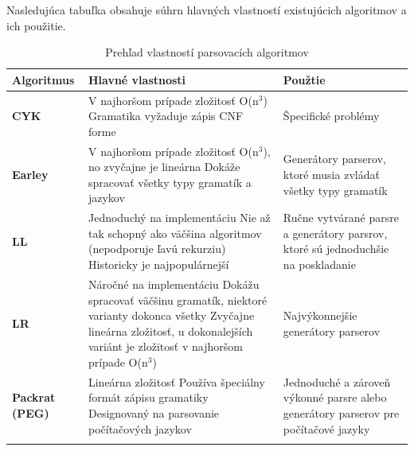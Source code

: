 Nasledujúca tabuľka obsahuje súhrn hlavných vlastností existujúcich algoritmov a ich použitie\cite{tomassetti:parsing}.

\begin{longtable}{|p{2.5cm}|p{6cm}|p{5.5cm}|}
\hline
\textbf{Algoritmus}    & \textbf{Hlavné vlastnosti}    						& \textbf{Použtie} \\ \hline
\textbf{CYK} \cite{CYK} & V najhoršom prípade zložitosť O(n$^3$)\newline 
						Gramatika vyžaduje zápis CNF forme					& Špecifické problémy \\ \hline
                        
\textbf{Earley}
\cite{earley}		  & V najhoršom prípade zložitosť O(n$^3$), 
						no zvyčajne je lineárna\newline 
                        Dokáže spracovať všetky typy gramatík a jazykov		& Generátory parserov, ktoré musia 
                                                                              zvládať všetky typy gramatík  \\ \hline
                                                                              
  \textbf{LL} \cite{LL} & Jednoduchý na implementáciu \newline 
						 Nie až tak schopný ako väčšina algoritmov 
                         (nepodporuje ľavú rekurziu) \newline 
                         Historicky je najpopulárnejší						& Ručne vytvárané parsre a generátory 
                        													  parsrov, ktoré sú jednoduchšie na poskladanie  \\ \hline
                                                                              
\textbf{LR} \cite{LR}   & Náročné na implementáciu \newline 
						 Dokážu spracovať väčšinu gramatík, niektoré 
                         varianty dokonca všetky\newline 
                         Zvyčajne lineárna zložitosť, u dokonalejších 
                         variánt je zložitosť v najhoršom prípade O(n$^3$)		& Najvýkonnejšie generátory parserov \\ \hline
                         
\textbf{Packrat (PEG)}
\cite{Packrat}			& Lineárna zložitosť\newline 
						 Používa špeciálny formát zápisu gramatiky\newline 
                         Designovaný na parsovanie počítačových jazykov		& Jednoduché a zároveň výkonné parsre alebo 
                         													  generátory parserov pre počítačové jazyky \\ \hline         
\caption{Prehľad vlastností parsovacích algoritmov}
\label{my-label}
\end{longtable}


